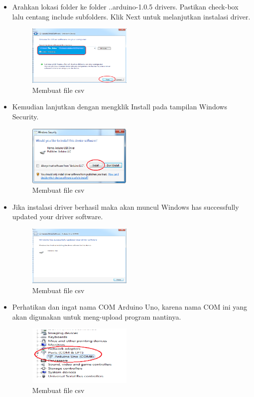 \begin{enumerate}
\begin{itemize}
\item Arahkan lokasi folder ke folder ..arduino-1.0.5 drivers. Pastikan check-box lalu centang include subfolders. Klik Next untuk melanjutkan instalasi driver.
\begin{figure}[H] 
\includegraphics[width=5cm]{figures/5/Teori/1174005/8.png}
\centering
\caption{Membuat file csv}
\end{figure}

\item Kemudian lanjutkan dengan mengklik Install pada tampilan Windows Security.
\begin{figure}[H] 
\includegraphics[width=5cm]{figures/5/Teori/1174005/9.png}
\centering
\caption{Membuat file csv}
\end{figure}

\item Jika instalasi driver berhasil maka akan muncul Windows has successfully updated your driver software.
\begin{figure}[H] 
\includegraphics[width=5cm]{figures/5/Teori/1174005/10.png}
\centering
\caption{Membuat file csv}
\end{figure}

\item Perhatikan dan ingat nama COM Arduino Uno, karena nama COM ini yang akan digunakan untuk meng-upload program nantinya.
\begin{figure}[H] 
\includegraphics[width=5cm]{figures/5/Teori/1174005/11.png}
\centering
\caption{Membuat file csv}
\end{figure}
\end{itemize}
\end{enumerate}
